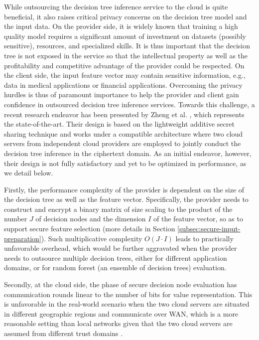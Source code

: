 \documentclass[10pt,journal,compsoc]{IEEEtran}
\begin{document}
While outsourcing the decision tree inference service to the cloud is quite beneficial, it also raises critical privacy concerns on the decision tree model and the input data.
%
On the provider side, it is widely known that training a high quality model requires a significant amount of investment on datasets (possibly sensitive), resources, and specialized skills. It is thus important that the decision tree is not exposed in the service so that the intellectual property as well as the profitability and competitive advantage of the provider could be respected.
%
On the client side, the input feature vector may contain sensitive information, e.g., data in medical applications or financial applications.
%
Overcoming the privacy hurdles is thus of paramount importance to help the provider and client gain confidence in outsourced decision tree inference services.
%
Towards this challenge, a recent research endeavor has been presented by Zheng et al. \cite{ZhengDWWN20}, which represents the state-of-the-art.
%
Their design is based on the lightweight additive secret sharing technique and works under a compatible architecture where two cloud servers from independent cloud providers are employed to jointly conduct the decision tree inference in the ciphertext domain. 
%
As an initial endeavor, however, their design is not fully satisfactory and yet to be optimized in performance, as we detail below.
%


Firstly, the performance complexity of the provider is dependent on the size of the decision tree as well as the feature vector. 
%
Specifically, the provider needs to construct and encrypt a binary matrix of size scaling to the product of the number $J$ of decision nodes and the dimension $I$ of the feature vector, so as to support secure feature selection (more details in Section \ref{subsec:secure-input-preparation}). 
%
Such multiplicative complexity $O(J\cdot I)$ leads to practically unfavorable overhead, which would be further aggravated when the provider needs to outsource multiple decision trees, either for different application domains, or for random forest (an ensemble of decision trees) evaluation.
%


Secondly, at the cloud side, the phase of secure decision node evaluation has communication rounds linear to the number of bits for value representation.
%
This is unfavorable in the real-world scenario when the two cloud servers are situated in different geographic regions and communicate over WAN, which is a more reasonable setting than local networks given that the two cloud servers are assumed from different trust domains \cite{ChenPopa20}.
\end{document}
